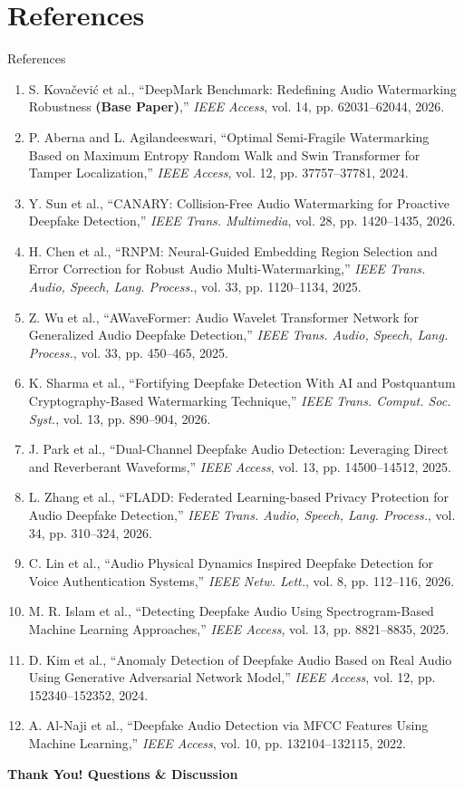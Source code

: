 \documentclass[10pt, aspectratio=169]{beamer}
\begin{document}
\section{References}
\begin{frame}[allowframebreaks]{References}
  \tiny
  \begin{enumerate}
    \item S. Kova\v{c}evi\'c et al., ``DeepMark Benchmark: Redefining Audio Watermarking Robustness \textbf{(Base Paper)},'' \textit{IEEE Access}, vol. 14, pp. 62031--62044, 2026.
    \item P. Aberna and L. Agilandeeswari, ``Optimal Semi-Fragile Watermarking Based on Maximum Entropy Random Walk and Swin Transformer for Tamper Localization,'' \textit{IEEE Access}, vol. 12, pp. 37757--37781, 2024.
    \item Y. Sun et al., ``CANARY: Collision-Free Audio Watermarking for Proactive Deepfake Detection,'' \textit{IEEE Trans. Multimedia}, vol. 28, pp. 1420--1435, 2026.
    \item H. Chen et al., ``RNPM: Neural-Guided Embedding Region Selection and Error Correction for Robust Audio Multi-Watermarking,'' \textit{IEEE Trans. Audio, Speech, Lang. Process.}, vol. 33, pp. 1120--1134, 2025.
    \item Z. Wu et al., ``AWaveFormer: Audio Wavelet Transformer Network for Generalized Audio Deepfake Detection,'' \textit{IEEE Trans. Audio, Speech, Lang. Process.}, vol. 33, pp. 450--465, 2025.
    \item K. Sharma et al., ``Fortifying Deepfake Detection With AI and Postquantum Cryptography-Based Watermarking Technique,'' \textit{IEEE Trans. Comput. Soc. Syst.}, vol. 13, pp. 890--904, 2026.
    \item J. Park et al., ``Dual-Channel Deepfake Audio Detection: Leveraging Direct and Reverberant Waveforms,'' \textit{IEEE Access}, vol. 13, pp. 14500--14512, 2025.
    \item L. Zhang et al., ``FLADD: Federated Learning-based Privacy Protection for Audio Deepfake Detection,'' \textit{IEEE Trans. Audio, Speech, Lang. Process.}, vol. 34, pp. 310--324, 2026.
    \item C. Lin et al., ``Audio Physical Dynamics Inspired Deepfake Detection for Voice Authentication Systems,'' \textit{IEEE Netw. Lett.}, vol. 8, pp. 112--116, 2026.
    \item M. R. Islam et al., ``Detecting Deepfake Audio Using Spectrogram-Based Machine Learning Approaches,'' \textit{IEEE Access}, vol. 13, pp. 8821--8835, 2025.
    \item D. Kim et al., ``Anomaly Detection of Deepfake Audio Based on Real Audio Using Generative Adversarial Network Model,'' \textit{IEEE Access}, vol. 12, pp. 152340--152352, 2024.
    \item A. Al-Naji et al., ``Deepfake Audio Detection via MFCC Features Using Machine Learning,'' \textit{IEEE Access}, vol. 10, pp. 132104--132115, 2022.
  \end{enumerate}

  \vfill
  \centering
  \Large \textbf{\textcolor{IEEEblue}{Thank You! Questions \& Discussion}}
\end{frame}
\end{document}
